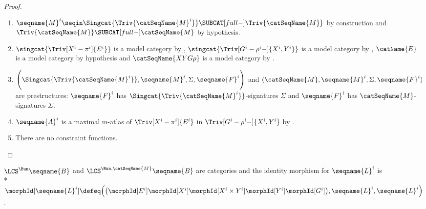 \documentclass{article}
\begin{document}
\begin{theorem}
\begin{proof}
\begin{enumerate}
\item
$
  \seqname{M}^i \seqin
  \Singcat{\Triv{\catSeqName{M}^i}} \SUBCAT[full-]
  \Triv{\catSeqName{M}}
$
by construction and $\Triv{\catSeqName{M}} \SUBCAT[full-]\catSeqName{M}$
by hypothesis.

\item $\singcat{\Triv[X^i-\pi^i]{E^i}}$ is a model category by
, $\singcat{\Triv[G^i-\rho^i-]{X^i,Y^i}}$ is a
model category by , $\catName{E}$ is a model
category by hypothesis and $\catSeqName{XYG\rho}$ is a model category by
.

\item
$
  \Biggl (
    \Singcat{\Triv{\catSeqName{M}^i}},
    \seqname{M}^i,
    \Sigma,
    \seqname{F}^i
  \Biggr )
$
and $(\catSeqName{M}, \seqname{M}^i, \Sigma, \seqname{F}^i)$
are prestructures:
$\seqname{F}^i$ has $\Singcat{\Triv{\catSeqName{M}^i}}$-signatures
$\Sigma$ and $\seqname{F}^i$ has $\catSeqName{M}$-signatures $\Sigma$.

\item $\seqname{A}^i$ is a maximal m-atlas of $\Triv[X^i-\pi^i]{E^i}$ in
$\Triv[G^i-\rho^i-]{X^i,Y^i}$ by .
\item There are no constraint functions.
\end{enumerate}
\end{proof}

$\LCS^\Bun \seqname{B}$ and $\LCS^{\Bun,\catSeqName{M}} \seqname{B}$ are
categories and the identity morphism for $\seqname{L}^i$ is \\*
$
  \morphId[{\seqname{L}^i}] \defeq
  \Bigl (
    \bigl (
      \morphId[E^i]
      \morphId[X^i]
      \morphId[{X^i \times Y^i}]
      \morphId[Y^i]
      \morphId[G^i]
    \bigr ),
    \seqname{L}^i,
    \seqname{L}^i
  \Bigr )
$.


\end{theorem}
\end{document}
